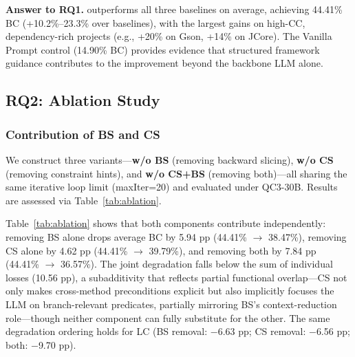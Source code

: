 \noindent\textbf{Answer to RQ1.}
\ourmethod{} outperforms all three baselines on average, achieving 44.41\% BC (+10.2\%--23.3\% over baselines), with the largest gains on high-CC, dependency-rich projects (e.g., +20\% on Gson, +14\% on JCore). The Vanilla Prompt control (14.90\% BC) provides evidence that structured framework guidance contributes to the improvement beyond the backbone LLM alone.


\subsection{RQ2: Ablation Study}



\subsubsection{Contribution of BS and CS}
We construct three variants---\textbf{w/o BS} (removing backward slicing), \textbf{w/o CS} (removing constraint hints), and \textbf{w/o CS+BS} (removing both)---all sharing the same iterative loop limit (maxIter=20) and evaluated under QC3-30B. Results are assessed via Table~\ref{tab:ablation}.

Table~\ref{tab:ablation} shows that both components contribute independently: removing BS alone drops average BC by 5.94 pp (44.41\% $\to$ 38.47\%), removing CS alone by 4.62 pp (44.41\% $\to$ 39.79\%), and removing both by 7.84 pp (44.41\% $\to$ 36.57\%). 
The joint degradation falls below the sum of individual losses (10.56 pp), a subadditivity that reflects partial functional overlap---CS not only makes cross-method preconditions explicit but also implicitly focuses the LLM on branch-relevant predicates, partially mirroring BS's context-reduction role---though neither component can fully substitute for the other. 
The same degradation ordering holds for LC (BS removal: $-$6.63 pp; CS removal: $-$6.56 pp; both: $-$9.70 pp).


